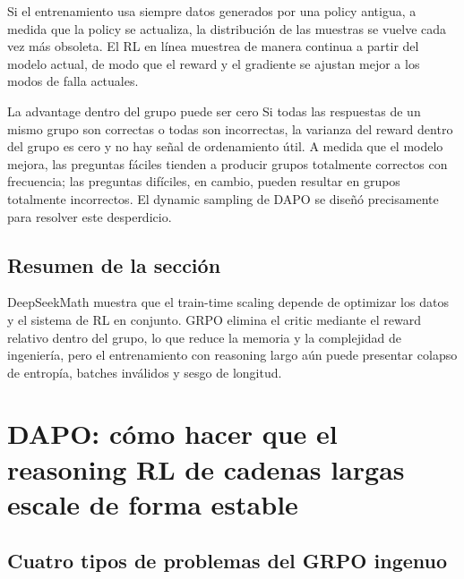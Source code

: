\documentclass[a4paper]{article}
\begin{document}
Si el entrenamiento usa siempre datos generados por una policy antigua, a medida que la policy se actualiza, la distribución de las muestras se vuelve cada vez más obsoleta. El RL en línea muestrea de manera continua a partir del modelo actual, de modo que el reward y el gradiente se ajustan mejor a los modos de falla actuales.


\begin{warningbox}{La advantage dentro del grupo puede ser cero}
Si todas las respuestas de un mismo grupo son correctas o todas son incorrectas, la varianza del reward dentro del grupo es cero y no hay señal de ordenamiento útil. A medida que el modelo mejora, las preguntas fáciles tienden a producir grupos totalmente correctos con frecuencia; las preguntas difíciles, en cambio, pueden resultar en grupos totalmente incorrectos. El dynamic sampling de DAPO se diseñó precisamente para resolver este desperdicio.
\end{warningbox}

\subsection{Resumen de la sección}

DeepSeekMath muestra que el train-time scaling depende de optimizar los datos y el sistema de RL en conjunto. GRPO elimina el critic mediante el reward relativo dentro del grupo, lo que reduce la memoria y la complejidad de ingeniería, pero el entrenamiento con reasoning largo aún puede presentar colapso de entropía, batches inválidos y sesgo de longitud.
\section{DAPO: cómo hacer que el reasoning RL de cadenas largas escale de forma estable}

\subsection{Cuatro tipos de problemas del GRPO ingenuo}

\end{document}
